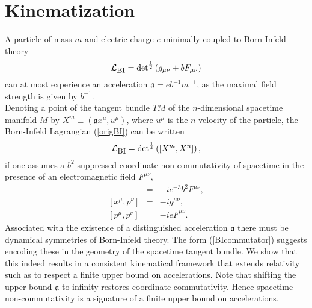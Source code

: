 \documentclass[11pt,a4paper,twoside]{article}
\begin{document}
\section{Kinematization}
\label{Kinematization}
A particle of mass $m$ and electric charge $e$ minimally coupled to
Born-Infeld theory \cite{BornInfeld}
\begin{equation}\label{origBI}
  \mathcal{L}_\textrm{\small BI} = {\det}^{\frac{1}{2}}\left(g_{\mu\nu}+bF_{\mu\nu}\right)
\end{equation}
can at most experience an acceleration $\mathfrak{a} = e b^{-1}
m^{-1}$, as the maximal field strength is given by $b^{-1}$.\\
Denoting a point of the tangent bundle $TM$ of the $n$-dimensional spacetime manifold
$M$ by $X^m\equiv(\mathfrak{a} x^\mu, u^\mu)$, where $u^\mu$ is the
$n$-velocity of the particle, the Born-Infeld Lagrangian (\ref{origBI})
can be written
\begin{equation}\label{BIcommutator}
  \mathcal{L}_\textrm{\small BI} = {\det}^{\frac{1}{4}}\left([X^m,X^n]\right),
\end{equation}
if one assumes a $b^2$-suppressed coordinate
non-commutativity of spacetime in the presence of an electromagnetic field $F^{\mu\nu}$,
\begin{eqnarray}
  [x^\mu, x^\nu] &=& - i e^{-3} b^2 F^{\mu\nu},\\{}
  [x^\mu, p^\nu] &=& - i g^{\mu\nu},\\{}
  [p^\mu, p^\nu] &=& - i e F^{\mu\nu}.
\end{eqnarray}
Associated with the existence of a distinguished acceleration
$\mathfrak{a}$ there must be dynamical symmetries of Born-Infeld
theory. The form (\ref{BIcommutator}) suggests encoding these in
the geometry of the spacetime tangent bundle. We show that this
indeed results in a consistent kinematical framework that extends relativity
such as to respect a finite upper bound on accelerations.
Note that shifting the upper bound $\mathfrak{a}$ to infinity restores
coordinate commutativity. Hence spacetime
non-commutativity is a signature of a finite upper bound on
accelerations.
\end{document}
